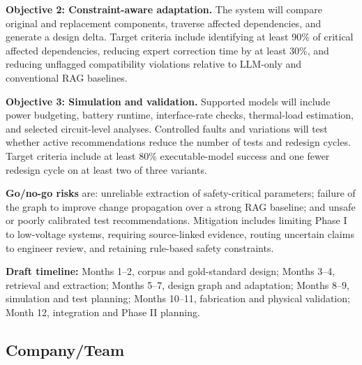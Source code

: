 \documentclass[12pt,letterpaper]{article}
\begin{document}
\textbf{Objective 2: Constraint-aware adaptation.} The system will compare original and replacement components, traverse affected dependencies, and generate a design delta. Target criteria include identifying at least 90\% of critical affected dependencies, reducing expert correction time by at least 30\%, and reducing unflagged compatibility violations relative to LLM-only and conventional RAG baselines.

\textbf{Objective 3: Simulation and validation.} Supported models will include power budgeting, battery runtime, interface-rate checks, thermal-load estimation, and selected circuit-level analyses. Controlled faults and variations will test whether active recommendations reduce the number of tests and redesign cycles. Target criteria include at least 80\% executable-model success and one fewer redesign cycle on at least two of three variants.

\textbf{Go/no-go risks} are: unreliable extraction of safety-critical parameters; failure of the graph to improve change propagation over a strong RAG baseline; and unsafe or poorly calibrated test recommendations. Mitigation includes limiting Phase I to low-voltage systems, requiring source-linked evidence, routing uncertain claims to engineer review, and retaining rule-based safety constraints.

\textbf{Draft timeline:} Months 1--2, corpus and gold-standard design; Months 3--4, retrieval and extraction; Months 5--7, design graph and adaptation; Months 8--9, simulation and test planning; Months 10--11, fabrication and physical validation; Month 12, integration and Phase II planning.

\subsection{Company/Team}
\end{document}

